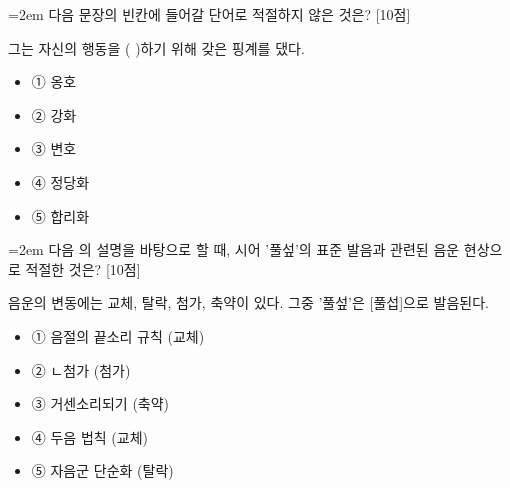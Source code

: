 \documentclass[11pt,a4paper]{article}
\newcommand{\qnum}[1]{%
  \tikz[baseline=(num.base)]{%
    \node[circle, fill=numCircle, text=white, inner sep=0pt,
          minimum size=18pt, font=\small\bfseries] (num) {#1};%
  }%
}
\newcommand{\pts}[1]{%
  \hfill\textcolor{ptsBadge}{[#1점]}%
}
\begin{document}
\vspace{4mm}
\begin{minipage}{\columnwidth}
{\hangindent=2em
\qnum{19}\enspace 다음 문장의 빈칸에 들어갈 단어로 적절하지 않은 것은? \pts{10}
\par}

\vspace{3mm}
\begin{tcolorbox}[bogi]
그는 자신의 행동을 (          )하기 위해 갖은 핑계를 댔다.
\end{tcolorbox}
\vspace{3mm}
\begin{itemize}[leftmargin=2.5em, labelsep=0.3em, label={}, itemsep=4pt, parsep=1pt, topsep=0pt]
  \item ① 옹호
  \item ② 강화
  \item ③ 변호
  \item ④ 정당화
  \item ⑤ 합리화
\end{itemize}
\end{minipage}
\vspace{4mm}

\vspace{4mm}
\begin{minipage}{\columnwidth}
{\hangindent=2em
\qnum{20}\enspace 다음 의 설명을 바탕으로 할 때, 시어 '풀섶'의 표준 발음과 관련된 음운 현상으로 적절한 것은? \pts{10}
\par}

\vspace{3mm}
\begin{tcolorbox}[bogi]
음운의 변동에는 교체, 탈락, 첨가, 축약이 있다. 그중 '풀섶'은 [풀섭]으로 발음된다.
\end{tcolorbox}
\vspace{3mm}
\begin{itemize}[leftmargin=2.5em, labelsep=0.3em, label={}, itemsep=4pt, parsep=1pt, topsep=0pt]
  \item ① 음절의 끝소리 규칙 (교체)
  \item ② ㄴ첨가 (첨가)
  \item ③ 거센소리되기 (축약)
  \item ④ 두음 법칙 (교체)
  \item ⑤ 자음군 단순화 (탈락)
\end{itemize}
\end{minipage}
\vspace{4mm}
\end{document}

